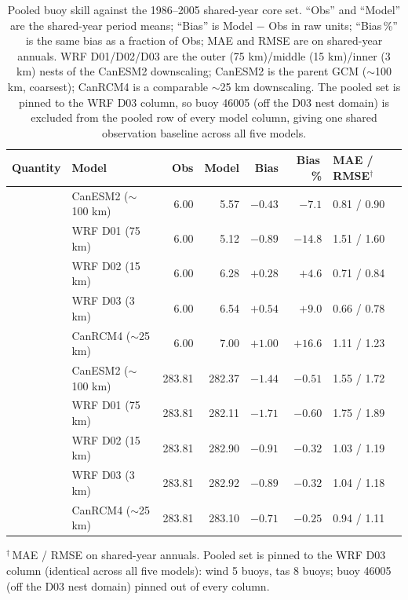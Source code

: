 \begin{table}[t]
\centering
\caption{Pooled buoy skill against the 1986--2005 shared-year core set.
``Obs'' and ``Model'' are the shared-year period means; ``Bias'' is
Model $-$ Obs in raw units; ``Bias\,\%'' is the same bias as a fraction
of Obs; MAE and RMSE are on shared-year annuals. WRF D01/D02/D03 are the
outer (75 km)/middle (15 km)/inner (3 km) nests of the CanESM2
downscaling; CanESM2 is the parent GCM ($\sim$100 km, coarsest); CanRCM4
is a comparable $\sim$25 km downscaling. The pooled set is pinned to
the WRF D03 column, so buoy 46005 (off the D03 nest domain) is excluded
from the pooled row of every model column, giving one shared observation
baseline across all five models.}
\begin{tabular}{llrrrr}
\hline\hline
Quantity & Model & Obs & Model & Bias & Bias\,\% & MAE / RMSE$^{\dagger}$ \\
\hline
{}
& CanESM2 ($\sim$100 km) & 6.00 & 5.57 & $-0.43$ & $-7.1$  & 0.81 / 0.90 \\
& WRF D01 (75 km)         & 6.00 & 5.12 & $-0.89$ & $-14.8$ & 1.51 / 1.60 \\
& WRF D02 (15 km)         & 6.00 & 6.28 & $+0.28$ & $+4.6$  & 0.71 / 0.84  \\
& WRF D03 (3 km)          & 6.00 & 6.54 & $+0.54$ & $+9.0$  & 0.66 / 0.78  \\
& CanRCM4 ($\sim$25 km)   & 6.00 & 7.00 & $+1.00$ & $+16.6$ & 1.11 / 1.23 \\
\hline
{}
& CanESM2 ($\sim$100 km) & 283.81 & 282.37 & $-1.44$ & $-0.51$ & 1.55 / 1.72 \\
& WRF D01 (75 km)         & 283.81 & 282.11 & $-1.71$ & $-0.60$ & 1.75 / 1.89 \\
& WRF D02 (15 km)         & 283.81 & 282.90 & $-0.91$ & $-0.32$ & 1.03 / 1.19 \\
& WRF D03 (3 km)          & 283.81 & 282.92 & $-0.89$ & $-0.32$ & 1.04 / 1.18 \\
& CanRCM4 ($\sim$25 km)   & 283.81 & 283.10 & $-0.71$ & $-0.25$ & 0.94 / 1.11 \\
\hline
\end{tabular}
\begin{minipage}{0.96\textwidth}
\raggedright
\footnotesize
$^{\dagger}$\,MAE / RMSE on shared-year annuals. Pooled set is pinned to
the WRF D03 column (identical across all five models): wind 5 buoys, tas
8 buoys; buoy 46005 (off the D03 nest domain) pinned out of every column.
\end{minipage}
\end{table}
